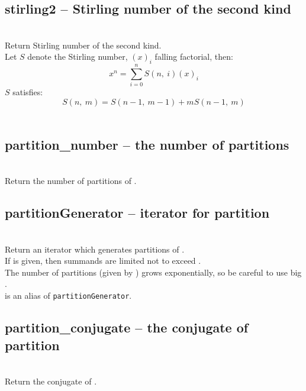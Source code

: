   \subsection{stirling2 -- Stirling number of the second kind}
   \\
   \spacing
   \quad Return Stirling number of the second kind.\\
   \spacing
   \quad Let \(S\) denote the Stirling number, \((x)_i\) falling factorial, then:
   \[x^n = \sum_{i=0}^{n} S(n,\ i) (x)_i\]
   \(S\) satisfies:
   \[S(n,\ m) = S(n-1,\ m-1) + m S(n-1,\ m)\]\\

  \subsection{partition\_number -- the number of partitions}
   \\
   \spacing
   \quad Return the number of partitions of .\\

  \subsection{partitionGenerator -- iterator for partition}
   \\
   \spacing
   \quad Return an iterator which generates partitions of .\\
   \spacing
   \quad If  is given, then summands are limited not to exceed .\\
   \quad The number of partitions (given by
   ) grows exponentially,
   so be careful to use big .\\
   \spacing 
   is an alias of {\tt partitionGenerator}.\\

  \subsection{partition\_conjugate -- the conjugate of partition}
   \\
   \spacing
   \quad Return the conjugate of .\\

